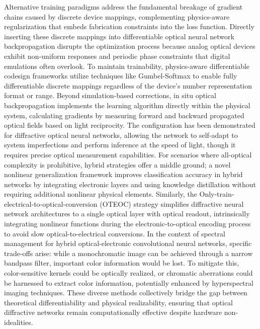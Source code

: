 Alternative training paradigms address the fundamental breakage of gradient chains caused by discrete device mappings, complementing physics-aware regularization that embeds fabrication constraints into the loss function. Directly inserting these discrete mappings into differentiable optical neural network backpropagation disrupts the optimization process because analog optical devices exhibit non-uniform responses and periodic phase constraints that digital emulations often overlook. To maintain trainability, physics-aware differentiable codesign frameworks utilize techniques like Gumbel-Softmax to enable fully differentiable discrete mappings regardless of the device's number representation format or range. Beyond simulation-based corrections, in situ optical backpropagation implements the learning algorithm directly within the physical system, calculating gradients by measuring forward and backward propagated optical fields based on light reciprocity. The configuration has been demonstrated for diffractive optical neural networks, allowing the network to self-adapt to system imperfections and perform inference at the speed of light, though it requires precise optical measurement capabilities. \citep{doi_10_1364_prj_389553_d7a30418} For scenarios where all-optical complexity is prohibitive, hybrid strategies offer a middle ground; a novel nonlinear generalization framework improves classification accuracy in hybrid networks by integrating electronic layers and using knowledge distillation without requiring additional nonlinear physical elements. Similarly, the Only-train-electrical-to-optical-conversion (OTEOC) strategy simplifies diffractive neural network architectures to a single optical layer with optical readout, intrinsically integrating nonlinear functions during the electronic-to-optical encoding process to avoid slow optical-to-electrical conversions. \citep{doi_10_1364_oe_462370_1269b480} In the context of spectral management for hybrid optical-electronic convolutional neural networks, specific trade-offs arise: while a monochromatic image can be achieved through a narrow bandpass filter, important color information would be lost. To mitigate this, color-sensitive kernels could be optically realized, or chromatic aberrations could be harnessed to extract color information, potentially enhanced by hyperspectral imaging techniques. These diverse methods collectively bridge the gap between theoretical differentiability and physical realizability, ensuring that optical diffractive networks remain computationally effective despite hardware non-idealities. \citep{doi_10_1145_3508352_3549378_13c53996} \citep{doi_10_1364_prj_389553_d7a30418} \citep{doi_10_1364_oe_446890_26d35f03} \citep{doi_10_1364_oe_462370_1269b480} \citep{doi_10_1038_s41598_018_30619_y_5f5bfb09}


